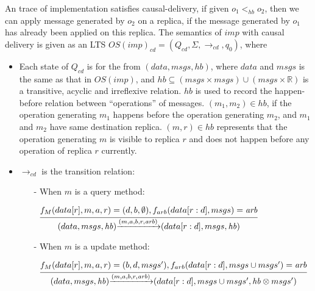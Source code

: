 An trace of implementation satisfies causal-delivery, if given $o_1 <_{\mathit{hb}} o_2$, then we can apply message generated by $o_2$ on a replica, if the message generated by $o_1$ has already been applied on this replica. The semantics of $imp$ with causal delivery is given as an LTS $OS(imp)_{\mathit{cd}} = (Q_{\mathit{cd}},\Sigma,\rightarrow_{\mathit{cd}},q_0)$, where

\begin {itemize}
\setlength{\itemsep}{0.5pt}
\item[-] Each state of $Q_{\mathit{cd}}$ is for the from $(data,msgs,\mathit{hb})$, where $data$ and $msgs$ is the same as that in $OS(imp)$, and $\mathit{hb} \subseteq (msgs \times msgs) \cup (msgs \times \mathbb{R})$ is a transitive, acyclic and irreflexive relation. $\mathit{hb}$ is used to record the happen-before relation between ``operations'' of messages. %
    $(m_1,m_2) \in \mathit{hb}$, if the operation generating $m_1$ happens before the operation generating $m_2$, and $m_1$ and $m_2$ have same destination replica. $(m,r) \in \mathit{hb}$ represents that the operation generating $m$ is visible to replica $r$ and does not happen before any operation of replica $r$ currently.

\item[-] $\rightarrow_{\mathit{cd}}$ is the transition relation:

    \begin{itemize}
    \setlength{\itemsep}{0.5pt}
    \item[-] When $m$ is a query method:

    $\begin{array}{l c} \bigfrac{ f_M(data[r],m,a,r) = (d,b,\emptyset),f_{arb}(data[r:d],msgs) = \mathit{arb}} {(data,msgs,\mathit{hb}) {\xrightarrow{(m,a,b,r,\mathit{arb})}} (data[r:d],msgs,\mathit{hb})} \end{array}$

    \item[-] When $m$ is a update method:

    $\begin{array}{l c} \bigfrac{ f_M(data[r],m,a,r)= (b,d,msgs'), f_{arb}(data[r:d],msgs \cup msgs') = \mathit{arb} } {(data,msgs,\mathit{hb}) {\xrightarrow{(m,a,b,r,\mathit{arb})}} (data[r:d],msgs \cup msgs',\mathit{hb} \otimes msgs')} \end{array}$


\end{itemize}
\end{itemize}
